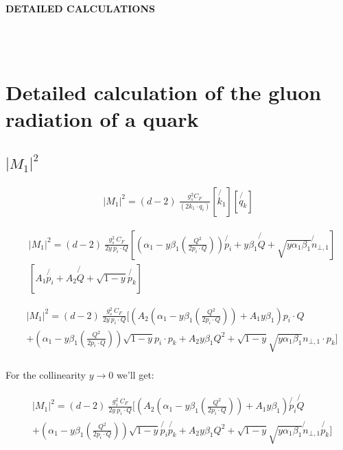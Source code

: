 \begin{LARGE}
\textbf{DETAILED CALCULATIONS}
\end{LARGE}
\\
\\


\section*{Detailed calculation of the gluon radiation of a quark}
\subsection*{$ |M_1|^2 $}

\begin{equation}
\begin{split}
|M_1|^2=(d-2)\:\frac{g_s^2  C_F }{(2k_1\cdot q_i)}
[\not{k_1} ][\not{q_k}]
\end{split}
\end{equation}

\begin{equation}
\begin{split}
&|M_1|^2=(d-2)\:\frac{g_s^2 \: C_F }{2y\: p_i \cdot Q}
[(\alpha_1 -y\beta_1(\frac{Q^2}{2p_i \cdot Q})) \not{p_i} + y\beta_1\not{Q} + \sqrt{y\alpha_1\beta_1}\not{n}_{\bot,1} ]\\
&[A_1\not{p_i} + A_2\not{Q} + \sqrt{1-y}\not{p_k}]
\end{split}
\end{equation}

\begin{equation}
\begin{split}
&|M_1|^2=(d-2)\:\frac{g_s^2 \: C_F }{2y\: p_i \cdot Q}
[(A_2(\alpha_1 -y\beta_1(\frac{Q^2}{2p_i \cdot Q}))+ A_1y\beta_1) {p_i}\cdot Q\\
&+(\alpha_1 -y\beta_1(\frac{Q^2}{2p_i \cdot Q}))\sqrt{1-y}p_i\cdot p_k+A_2 y\beta_1 Q^2+ \sqrt{1-y}\sqrt{y\alpha_1\beta_1}{n}_{\bot,1}\cdot p_k ]\\
\end{split}
\end{equation}

For the collinearity $ y \rightarrow 0 $ we'll get:

\begin{equation}
\begin{split}
&|M_1|^2=(d-2)\:\frac{g_s^2 \: C_F }{2y\: p_i \cdot Q}
[(A_2(\alpha_1 -y\beta_1(\frac{Q^2}{2p_i \cdot Q}))+ A_1y\beta_1) \not{p_i} \not{Q}\\
&+(\alpha_1 -y\beta_1(\frac{Q^2}{2p_i \cdot Q}))\sqrt{1-y}\not{p_i} \not{p_k}+A_2 y\beta_1 Q^2+ \sqrt{1-y}\sqrt{y\alpha_1\beta_1}\not{n}_{\bot,1} \not{p_k} ]\\
\end{split}
\end{equation}

